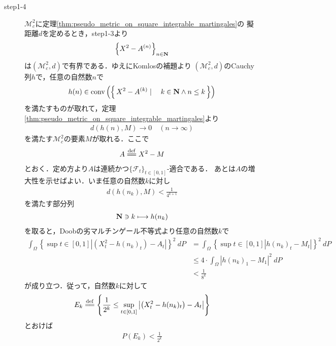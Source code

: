 \begin{sketch}
\begin{description}
			\item[step1-4]
				$\mathscr{M}_{c}^{2}$に定理\ref{thm:pseudo_metric_on_square_integrable_martingales}の
				擬距離$d$を定めるとき，step1-3より
				\begin{align}
					\left\{X^2 - A^{(n)}\right\}_{n \in \mathbf{N}}
				\end{align}
				は$\left(\mathscr{M}_{c}^{2},d\right)$で有界である．ゆえにKomlosの補題より
				$\left(\mathscr{M}_{c}^{2},d\right)$のCauchy列$h$で，任意の自然数$n$で
				\begin{align}
					h(n) \in \operatorname*{conv} \left(\left\{\, X^2-A^{(k)} \mid \quad k \in \mathbf{N} \wedge n \leq k\, \right\}\right)
					\label{fom:thm_decomposition_of_square_integrable_martingales_5}
				\end{align}
				を満たすものが取れて，定理\ref{thm:pseudo_metric_on_square_integrable_martingales}より
				\begin{align}
					d(h(n),M) \longrightarrow 0\quad (n \longrightarrow \infty)
				\end{align}
				を満たす$\mathscr{M}_{c}^{2}$の要素$M$が取れる．ここで
				\begin{align}
					A \defeq X^2 - M
				\end{align}
				とおく．定め方より$A$は連続かつ$\{\mathscr{F}_t\}_{t \in [0,1]}$-適合である．
				あとは$A$の増大性を示せばよい．いま任意の自然数$k$に対し
				\begin{align}
					d(h(n_k),M) < \frac{1}{4^{k+1}}
				\end{align}
				を満たす部分列
				\begin{align}
					\mathbf{N} \ni k \longmapsto h(n_k)
				\end{align}
				を取ると，Doobの劣マルチンゲール不等式より任意の自然数$k$で
				\begin{align}
					\int_\Omega \left\{\sup{t \in [0,1]}{\left|\left(X^2_t - h(n_k)_t\right) - A_t\right|}\right\}^2\ dP
					&= \int_\Omega \left\{\sup{t \in [0,1]}{\left|h(n_k)_t - M_t\right|}\right\}^2\ dP \\
					&\leq 4 \cdot \int_\Omega \left|h(n_k)_{1} - M_{1}\right|^2\ dP \\
					&< \frac{1}{8^k}
				\end{align}
				が成り立つ．従って，自然数$k$に対して
				\begin{align}
					E_k \defeq \left\{ \frac{1}{2^k} \leq \sup{t \in [0,1]}{\left|\left(X^2_t - h(n_k)_t\right) - A_t\right|} \right\}
				\end{align}
				とおけば
				\begin{align}
					P(E_k) < \frac{1}{2^k}

\end{align}
\end{description}
\end{sketch}
